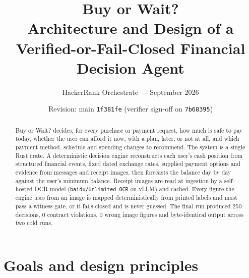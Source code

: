 \documentclass[11pt,a4paper]{article}
\title{\textbf{Buy or Wait?}\\[2pt]\large Architecture and Design of a Verified-or-Fail-Closed Financial Decision Agent}
\author{HackerRank Orchestrate --- September 2026}
\date{Revision: main \texttt{1f381fe} (verifier sign-off on \texttt{7b68395})}
\begin{document}
\maketitle

\begin{abstract}
\noindent Buy or Wait? decides, for every purchase or payment request, how much is safe to pay today, whether
the user can afford it now, with a plan, later, or not at all, and which payment method, schedule and
spending changes to recommend. The system is a single Rust crate. A deterministic decision engine
reconstructs each user's cash position from structured financial events, fixed dated exchange rates,
supplied payment options and evidence from messages and receipt images, then forecasts the balance
day by day against the user's minimum balance. Receipt images are read at ingestion by a self-hosted
OCR model (\texttt{baidu/Unlimited-OCR} on vLLM) and cached. Every figure the engine uses from an image
is mapped deterministically from printed labels and must pass a witness gate, or it fails closed and is
never guessed. The final run produced 250 decisions, 0 contract violations, 0 wrong image figures
and byte-identical output across two cold runs.
\end{abstract}

\tableofcontents
\newpage

\section{Goals and design principles}
\end{document}
